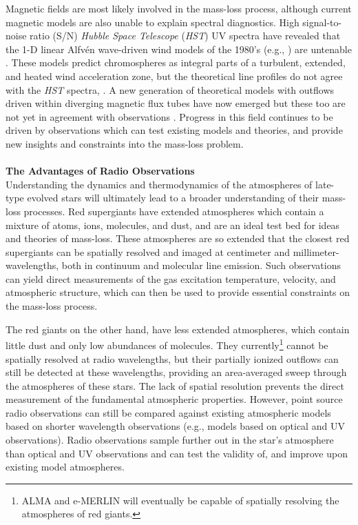 Magnetic fields are most likely involved in the mass-loss process, although current magnetic models are also unable to explain spectral diagnostics. High signal-to-noise ratio (S/N) \textit{Hubble Space Telescope} (\textit{HST}) UV spectra have revealed that the 1-D linear Alfv\'en wave-driven wind models of the 1980’s (e.g., \citealt{hartmann_1980,harper_1988}) are untenable \citep{harper_2001}. These models predict chromospheres as integral parts of a turbulent, extended, and heated wind acceleration zone, but the theoretical line profiles do not agree with the \textit{HST} spectra, \cite[e.g.,][]{judge_1998}. A new generation of theoretical models with outflows driven within diverging magnetic flux tubes have now emerged \citep{falceta_2006, suzuki_2007} but these too are not yet in agreement with observations \citep{crowley_2009}. Progress in this field continues to be driven by observations which can test existing models and theories, and provide new insights and constraints into the mass-loss problem.\\
\\
\textbf{The Advantages of Radio Observations}\\
Understanding the dynamics and thermodynamics of the atmospheres of late-type evolved stars will ultimately lead to a broader understanding of their mass-loss processes. Red supergiants have extended atmospheres which contain a mixture of atoms, ions, molecules, and dust, and are an ideal test bed for ideas and theories of mass-loss. These atmospheres are so extended that the closest red supergiants can be spatially resolved and imaged at centimeter and millimeter-wavelengths, both in continuum and molecular line emission. Such observations can yield direct measurements of the gas excitation temperature, velocity, and atmospheric structure, which can then be used to provide essential constraints on the mass-loss process. 

The red giants on the other hand, have less extended atmospheres, which contain little dust and only low abundances of molecules. They currently\footnote{ALMA and e-MERLIN will eventually be capable of spatially resolving the atmospheres of red giants.} cannot be spatially resolved at radio wavelengths, but their partially ionized outflows can still be detected at these wavelengths, providing an area-averaged sweep through the atmospheres of these stars. The lack of spatial resolution prevents the direct measurement of the fundamental atmospheric properties. However, point source radio observations can still be compared against existing atmospheric models based on shorter wavelength observations (e.g., models based on optical and UV observations). Radio observations sample further out in the star's atmosphere than optical and UV observations and can test the validity of, and improve upon existing model atmospheres. 

